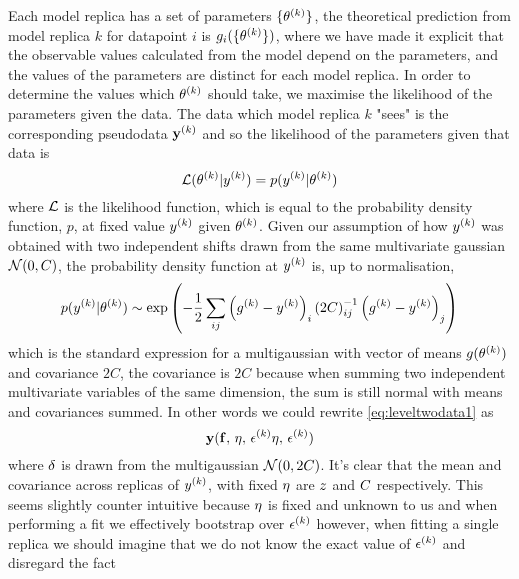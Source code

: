 Each model replica has a set of parameters $\{\theta^{(k)} \}$, the theoretical
prediction from model replica $k$ for datapoint $i$ is
$g_{i}(\{\theta^{(k)} \})$, where we have made it explicit that the observable
values calculated from the model depend on the parameters, and the values of the
parameters are distinct for each model replica. In order to determine the values
which $\theta^{(k)}$ should take, we maximise the likelihood of the parameters
given the data. The data which model replica $k$ "sees" is the corresponding
pseudodata $\mathbf{y}^{(k)}$ and so the likelihood of the parameters given
that data is
\begin{equation}
    \mathcal{L}(\theta^{(k)} \vert y^{(k)}) = p(y^{(k)} | \theta^{(k)})
\end{equation}
where $\mathcal{L}$ is the likelihood function, which is equal to the probability
density function, $p$, at fixed value $y^{(k)}$ given
$\theta^{(k)}$. Given our assumption of how $y^{(k)}$ was obtained
with two independent shifts drawn from the same multivariate gaussian
$\mathcal{N}(0, C)$, the probability density function at
$y^{(k)}$ is, up to normalisation,
\begin{equation}
    p(y^{(k)} | \theta^{(k)}) \sim
    \exp \left( - \frac{1}{2} \sum_{ij} \left( g^{(k)} - y^{(k)} \right)_i {(2C)}^{-1}_{ij} \left( g^{(k)} - y^{(k)} \right)_j \right)
\end{equation}
which is the standard expression for a multigaussian with vector of means
$g(\theta^{(k)})$ and covariance $2C$, the covariance is $2C$ because
when summing two independent multivariate variables of the same dimension, the
sum is still normal with means and covariances summed. In other words we could
rewrite \eqref{eq:leveltwodata1} as
\begin{equation}
    \mathbf{y}(\mathbf{f},\,\mathbf{\eta},\,\mathbf{\epsilon}^{(k)}\mathbf{\eta},\,\mathbf{\epsilon}^{(k)})
\end{equation}
where $\mathbf{\delta}$ is drawn from the multigaussian $\mathcal{N}(0, 2C)$.
It's clear that the mean and covariance
across replicas of $y^{(k)}$, with fixed $\eta$ are
$z$ and $C$ respectively. This seems slightly counter intuitive because
$\mathbf{\eta}$ is fixed and unknown to us and when performing a fit we effectively
bootstrap over $\mathbf{\epsilon}^{(k)}$ however,
when fitting a single replica we should imagine that
we do not know the exact value of $\epsilon^{(k)}$ and disregard the fact
